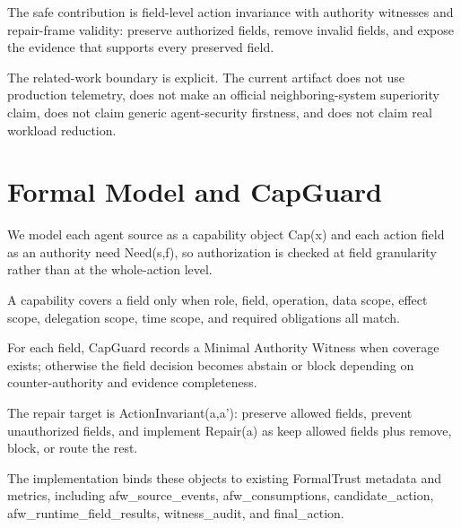 \documentclass[11pt]{article}
\begin{document}
The safe contribution is field-level action invariance with authority witnesses and repair-frame validity: preserve authorized fields, remove invalid fields, and expose the evidence that supports every preserved field.

The related-work boundary is explicit. The current artifact does not use production telemetry, does not make an official neighboring-system superiority claim, does not claim generic agent-security firstness, and does not claim real workload reduction.

\section{Formal Model and CapGuard}

We model each agent source as a capability object Cap(x) and each action field as an authority need Need(s,f), so authorization is checked at field granularity rather than at the whole-action level.

A capability covers a field only when role, field, operation, data scope, effect scope, delegation scope, time scope, and required obligations all match.

For each field, CapGuard records a Minimal Authority Witness when coverage exists; otherwise the field decision becomes abstain or block depending on counter-authority and evidence completeness.

The repair target is ActionInvariant(a,a'): preserve allowed fields, prevent unauthorized fields, and implement Repair(a) as keep allowed fields plus remove, block, or route the rest.

The implementation binds these objects to existing FormalTrust metadata and metrics, including afw\_source\_events, afw\_consumptions, candidate\_action, afw\_runtime\_field\_results, witness\_audit, and final\_action.
\end{document}
